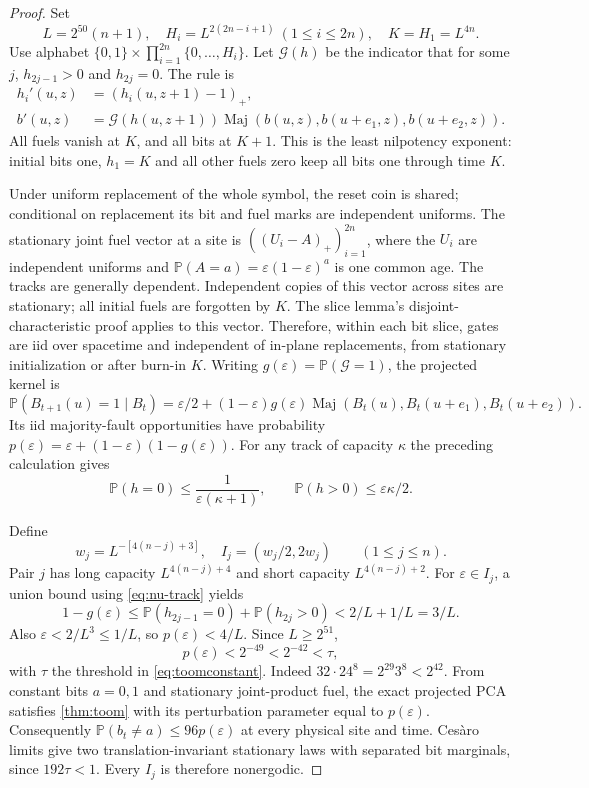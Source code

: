\documentclass[11pt]{article}
\theoremstyle{plain}
\theoremstyle{definition}
\theoremstyle{remark}
\newcommand{\Prob}{\mathbb P}
\newcommand{\eps}{\varepsilon}
\newcommand{\Maj}{\operatorname{Maj}}
\begin{document}
\begin{proof}
Set
\[
 L=2^{50}(n+1),\quad
 H_i=L^{2(2n-i+1)}\ (1\le i\le2n),\quad K=H_1=L^{4n}.
\]
Use alphabet $\{0,1\}\times\prod_{i=1}^{2n}\{0,\ldots,H_i\}$. Let $\mathcal G(h)$ be the indicator that for some $j$, $h_{2j-1}>0$ and $h_{2j}=0$. The rule is
\begin{align*}
 h_i'(u,z)&=(h_i(u,z+1)-1)_+,\\
 b'(u,z)&=\mathcal G(h(u,z+1))
     \Maj(b(u,z),b(u+e_1,z),b(u+e_2,z)).
\end{align*}
All fuels vanish at $K$, and all bits at $K+1$. This is the least nilpotency exponent: initial bits one, $h_1=K$ and all other fuels zero keep all bits one through time $K$.

Under uniform replacement of the whole symbol, the reset coin is shared; conditional on replacement its bit and fuel marks are independent uniforms. The stationary joint fuel vector at a site is $((U_i-A)_+)_{i=1}^{2n}$, where the $U_i$ are independent uniforms and $\Prob(A=a)=\eps(1-\eps)^a$ is one common age. The tracks are generally dependent. Independent copies of this vector across sites are stationary; all initial fuels are forgotten by $K$. The slice lemma's disjoint-characteristic proof applies to this vector. Therefore, within each bit slice, gates are iid over spacetime and independent of in-plane replacements, from stationary initialization or after burn-in $K$. Writing $g(\eps)=\Prob(\mathcal G=1)$, the projected kernel is
\[
 \Prob(B_{t+1}(u)=1\mid B_t)
 =\eps/2+(1-\eps)g(\eps)
       \Maj(B_t(u),B_t(u+e_1),B_t(u+e_2)).
\]
Its iid majority-fault opportunities have probability $p(\eps)=\eps+(1-\eps)(1-g(\eps))$. For any track of capacity $\kappa$ the preceding calculation gives
\begin{equation}\label{eq:nu-track}
 \Prob(h=0)\le\frac1{\eps(\kappa+1)},\qquad
 \Prob(h>0)\le\eps\kappa/2.
\end{equation}

Define
\[
 w_j=L^{-[4(n-j)+3]},\quad I_j=(w_j/2,2w_j)
 \qquad(1\le j\le n).
\]
Pair $j$ has long capacity $L^{4(n-j)+4}$ and short capacity $L^{4(n-j)+2}$. For $\eps\in I_j$, a union bound using \eqref{eq:nu-track} yields
\[
 1-g(\eps)\le\Prob(h_{2j-1}=0)+\Prob(h_{2j}>0)<2/L+1/L=3/L.
\]
Also $\eps<2/L^3\le1/L$, so $p(\eps)<4/L$. Since $L\ge2^{51}$,
\[
 p(\eps)<2^{-49}<2^{-42}<\tau,
\]
with $\tau$ the threshold in \eqref{eq:toomconstant}. Indeed $32\cdot24^8=2^{29}3^8<2^{42}$. From constant bits $a=0,1$ and stationary joint-product fuel, the exact projected PCA satisfies \cref{thm:toom} with its perturbation parameter equal to $p(\eps)$. Consequently $\Prob(b_t\ne a)\le96p(\eps)$ at every physical site and time. Ces\`aro limits give two translation-invariant stationary laws with separated bit marginals, since $192\tau<1$. Every $I_j$ is therefore nonergodic.


\end{proof}
\end{document}
